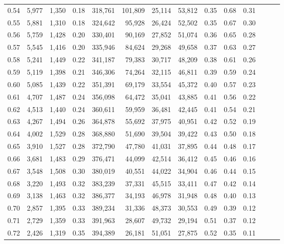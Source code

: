 \begin{tabular}{rrrrrrrrrrrrrr}
0.54 &  5,977 &  1,350 &  0.18 &  318,761 &  101,809 &  25,114 &  53,812 &  0.35 &  0.68 &      0.31 \\
0.55 &  5,881 &  1,310 &  0.18 &  324,642 &   95,928 &  26,424 &  52,502 &  0.35 &  0.67 &      0.30 \\
0.56 &  5,759 &  1,428 &  0.20 &  330,401 &   90,169 &  27,852 &  51,074 &  0.36 &  0.65 &      0.28 \\
0.57 &  5,545 &  1,416 &  0.20 &  335,946 &   84,624 &  29,268 &  49,658 &  0.37 &  0.63 &      0.27 \\
0.58 &  5,241 &  1,449 &  0.22 &  341,187 &   79,383 &  30,717 &  48,209 &  0.38 &  0.61 &      0.26 \\
0.59 &  5,119 &  1,398 &  0.21 &  346,306 &   74,264 &  32,115 &  46,811 &  0.39 &  0.59 &      0.24 \\
0.60 &  5,085 &  1,439 &  0.22 &  351,391 &   69,179 &  33,554 &  45,372 &  0.40 &  0.57 &      0.23 \\
0.61 &  4,707 &  1,487 &  0.24 &  356,098 &   64,472 &  35,041 &  43,885 &  0.41 &  0.56 &      0.22 \\
0.62 &  4,513 &  1,440 &  0.24 &  360,611 &   59,959 &  36,481 &  42,445 &  0.41 &  0.54 &      0.21 \\
0.63 &  4,267 &  1,494 &  0.26 &  364,878 &   55,692 &  37,975 &  40,951 &  0.42 &  0.52 &      0.19 \\
0.64 &  4,002 &  1,529 &  0.28 &  368,880 &   51,690 &  39,504 &  39,422 &  0.43 &  0.50 &      0.18 \\
0.65 &  3,910 &  1,527 &  0.28 &  372,790 &   47,780 &  41,031 &  37,895 &  0.44 &  0.48 &      0.17 \\
0.66 &  3,681 &  1,483 &  0.29 &  376,471 &   44,099 &  42,514 &  36,412 &  0.45 &  0.46 &      0.16 \\
0.67 &  3,548 &  1,508 &  0.30 &  380,019 &   40,551 &  44,022 &  34,904 &  0.46 &  0.44 &      0.15 \\
0.68 &  3,220 &  1,493 &  0.32 &  383,239 &   37,331 &  45,515 &  33,411 &  0.47 &  0.42 &      0.14 \\
0.69 &  3,138 &  1,463 &  0.32 &  386,377 &   34,193 &  46,978 &  31,948 &  0.48 &  0.40 &      0.13 \\
0.70 &  2,857 &  1,395 &  0.33 &  389,234 &   31,336 &  48,373 &  30,553 &  0.49 &  0.39 &      0.12 \\
0.71 &  2,729 &  1,359 &  0.33 &  391,963 &   28,607 &  49,732 &  29,194 &  0.51 &  0.37 &      0.12 \\
0.72 &  2,426 &  1,319 &  0.35 &  394,389 &   26,181 &  51,051 &  27,875 &  0.52 &  0.35 &      0.11 \\

\end{tabular}
